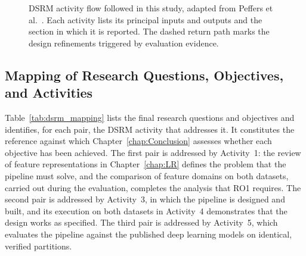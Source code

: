 \begin{figure}[!htbp]
\caption{DSRM activity flow followed in this study, adapted from Peffers et al.~\cite{peffers2007dsrm}. Each activity lists its principal inputs and outputs and the section in which it is reported. The dashed return path marks the design refinements triggered by evaluation evidence.}
\label{fig:dsrm_flow}
\end{figure}

\subsection{Mapping of Research Questions, Objectives, and Activities}
\label{sec:chap3DSRMMapping}
Table~\ref{tab:dsrm_mapping} lists the final research questions and objectives and identifies, for each pair, the DSRM activity that addresses it. It constitutes the reference against which Chapter~\ref{chap:Conclusion} assesses whether each objective has been achieved. The first pair is addressed by Activity~1: the review of feature representations in Chapter~\ref{chap:LR} defines the problem that the pipeline must solve, and the comparison of feature domains on both datasets, carried out during the evaluation, completes the analysis that RO1 requires. The second pair is addressed by Activity~3, in which the pipeline is designed and built, and its execution on both datasets in Activity~4 demonstrates that the design works as specified. The third pair is addressed by Activity~5, which evaluates the pipeline against the published deep learning models on identical, verified partitions.

